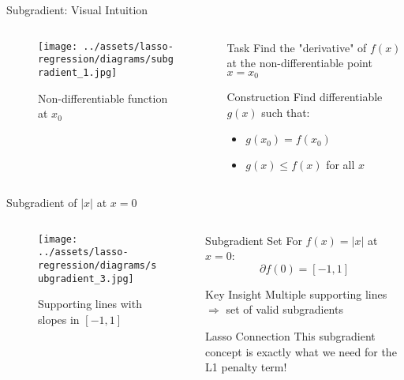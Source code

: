 \documentclass{beamer}
\begin{document}
\begin{frame}{Subgradient: Visual Intuition}
\begin{columns}
\begin{column}{0.5\textwidth}
\begin{figure}
\centering
\texttt{[image: ../assets/lasso-regression/diagrams/subgradient\_1.jpg]}
\caption{{\footnotesize Non-differentiable function at $x_0$}}
\label{fig:Non-differentiable function}
\end{figure}
\end{column}
\begin{column}{0.5\textwidth}
\begin{alertbox}{Task}
Find the "derivative" of $f(x)$ at the non-differentiable point $x = x_0$
\end{alertbox}

\begin{codebox}{Construction}
Find differentiable $g(x)$ such that:
\begin{itemize}
\item $g(x_0) = f(x_0)$
\item $g(x) \leq f(x)$ for all $x$
\end{itemize}
\end{codebox}
\end{column}
\end{columns}
\end{frame}

\begin{frame}{Subgradient of $|x|$ at $x = 0$}
\begin{columns}
\begin{column}{0.4\textwidth}
\begin{figure}
\centering
\texttt{[image: ../assets/lasso-regression/diagrams/subgradient\_3.jpg]}
\caption{{\footnotesize Supporting lines with slopes in $[-1,1]$}}
\end{figure}
\end{column}
\begin{column}{0.6\textwidth}
\begin{codebox}{Subgradient Set}
For $f(x) = |x|$ at $x = 0$:
$$\partial f(0) = [-1, 1]$$
\end{codebox}

\begin{keypointsbox}{Key Insight}
Multiple supporting lines $\Rightarrow$ set of valid subgradients
\end{keypointsbox}

\begin{alertbox}{Lasso Connection}
This subgradient concept is exactly what we need for the L1 penalty term!
\end{alertbox}
\end{column}
\end{columns}
\end{frame}
\end{document}
